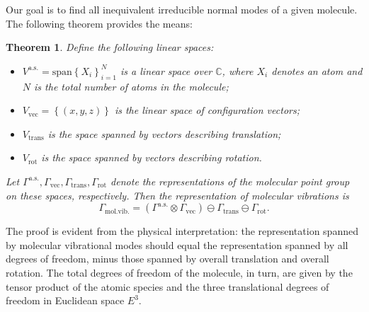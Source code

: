 \documentclass[lang=en, column=onecolumn, mathfont=times]{spArticle}
\newtheorem{theorem}{Theorem}
\begin{document}
Our goal is to find all inequivalent irreducible normal modes of a given molecule. The following theorem provides the means:
\begin{theorem}
    \label{thm}
    Define the following linear spaces:
    \begin{itemize}
        \item $V^{\mathrm{a.s.}}=\mathrm{span}\left\{X_i\right\}_{i=1}^N$ is a linear space over $\mathbb{C}$, where $X_i$ denotes an atom and $N$ is the total number of atoms in the molecule;
        \item $V_{\mathrm{vec}}=\left\{\left(x, y, z\right)\right\}$ is the linear space of configuration vectors;
        \item $V_{\mathrm{trans}}$ is the space spanned by vectors describing translation;
        \item $V_{\mathrm{rot}}$ is the space spanned by vectors describing rotation.
    \end{itemize}
    Let $\Gamma ^{\mathrm{a.s.}}, \Gamma _{\mathrm{vec}}, \Gamma _{\mathrm{trans}}, \Gamma _{\mathrm{rot}}$ denote the representations of the molecular point group on these spaces, respectively. Then the representation of molecular vibrations is
    \begin{equation}
        \Gamma _{\mathrm{mol}.\mathrm{vib}.}=\left( \Gamma ^{\mathrm{a}.\mathrm{s}.}\otimes \Gamma _{\mathrm{vec}} \right) \ominus \Gamma _{\mathrm{trans}}\ominus \Gamma _{\mathrm{rot}}.
    \end{equation}
\end{theorem}
The proof is evident from the physical interpretation: the representation spanned by molecular vibrational modes should equal the representation spanned by all degrees of freedom, minus those spanned by overall translation and overall rotation. The total degrees of freedom of the molecule, in turn, are given by the tensor product of the atomic species and the three translational degrees of freedom in Euclidean space $E^3$.
\end{document}

